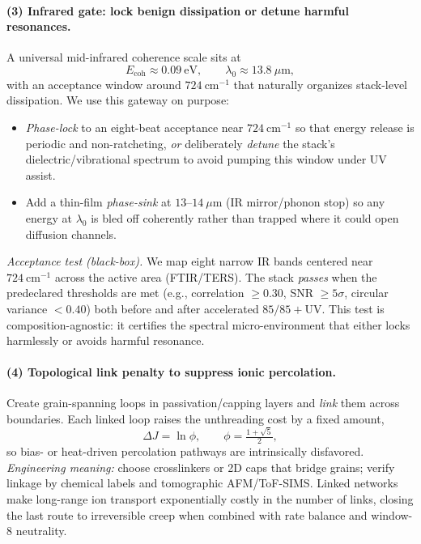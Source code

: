 \documentclass[12pt]{article}
\begin{document}
\paragraph{(3) Infrared gate: lock benign dissipation or detune harmful resonances.}
A universal mid-infrared coherence scale sits at
\begin{equation}
E_{\mathrm{coh}}\approx 0.09~\mathrm{eV},\qquad \lambda_{0}\approx 13.8~\mu\mathrm{m},
\end{equation}
with an acceptance window around $724~\mathrm{cm}^{-1}$ that naturally organizes stack-level dissipation. We use this gateway on purpose:
\begin{itemize}
  \item \emph{Phase-lock} to an eight-beat acceptance near $724~\mathrm{cm}^{-1}$ so that energy release is periodic and non-ratcheting, \emph{or} deliberately \emph{detune} the stack’s dielectric/vibrational spectrum to avoid pumping this window under UV assist.
  \item Add a thin-film \emph{phase-sink} at $13$–$14~\mu\mathrm{m}$ (IR mirror/phonon stop) so any energy at $\lambda_0$ is bled off coherently rather than trapped where it could open diffusion channels.
\end{itemize}
\emph{Acceptance test (black-box).} We map eight narrow IR bands centered near $724~\mathrm{cm}^{-1}$ across the active area (FTIR/TERS). The stack \emph{passes} when the predeclared thresholds are met (e.g., correlation $\ge 0.30$, SNR $\ge 5\sigma$, circular variance $<0.40$) both before and after accelerated $85/85+\mathrm{UV}$. This test is composition-agnostic: it certifies the spectral micro-environment that either locks harmlessly or avoids harmful resonance.

\paragraph{(4) Topological link penalty to suppress ionic percolation.}
Create grain-spanning loops in passivation/capping layers and \emph{link} them across boundaries. Each linked loop raises the unthreading cost by a fixed amount,
\begin{equation}
\Delta J=\ln \phi,\qquad \phi=\tfrac{1+\sqrt5}{2},
\end{equation}
so bias- or heat-driven percolation pathways are intrinsically disfavored. \emph{Engineering meaning:} choose crosslinkers or 2D caps that bridge grains; verify linkage by chemical labels and tomographic AFM/ToF-SIMS. Linked networks make long-range ion transport exponentially costly in the number of links, closing the last route to irreversible creep when combined with rate balance and window-8 neutrality.
\end{document}
